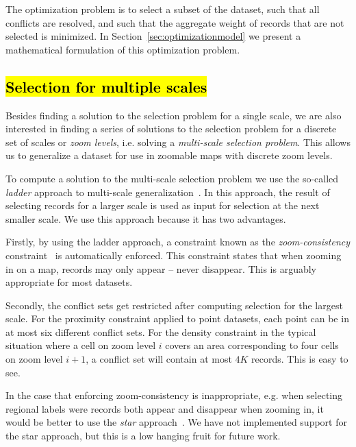 The optimization problem is to select a subset of the dataset, such that all conflicts are resolved, and such that the aggregate weight of records that are not selected is minimized. In Section~\ref{sec:optimizationmodel} we present a mathematical formulation of this optimization problem.

\subsection{\hl{Selection for multiple scales}}

Besides finding a solution to the selection problem for a single scale, we are also interested in finding a series of solutions to the selection problem for a discrete set of scales or \emph{zoom levels}, i.e. solving a \emph{multi-scale selection problem}. This allows us to generalize a dataset for use in zoomable maps with discrete zoom levels.

To compute a solution to the multi-scale selection problem we use the so-called \emph{ladder} approach to multi-scale generalization~\cite{foerster2010challenges}. In this approach, the result of selecting records for a larger scale is used as input for selection at the next smaller scale. We use this approach because it has two advantages.

Firstly, by using the ladder approach, a constraint known as the \emph{zoom-consistency} constraint~\cite{sarma2012fusiontables} is automatically enforced. This constraint states that when zooming in on a map, records may only appear -- never disappear. This is arguably appropriate for most datasets. 

Secondly, the conflict sets get restricted after computing selection for the largest scale. For the proximity constraint applied to point datasets, each point can be in at most six different conflict sets. For the density constraint in the typical situation where a cell on zoom level $i$ covers an area corresponding to four cells on zoom level $i+1$, a conflict set will contain at most $4K$ records. This is easy to see.

In the case that enforcing zoom-consistency is inappropriate, e.g. when selecting regional labels were records both appear and disappear when zooming in, it would be better to use the \emph{star} approach~\cite{foerster2010challenges}. We have not implemented support for the star approach, but this is a low hanging fruit for future work.



